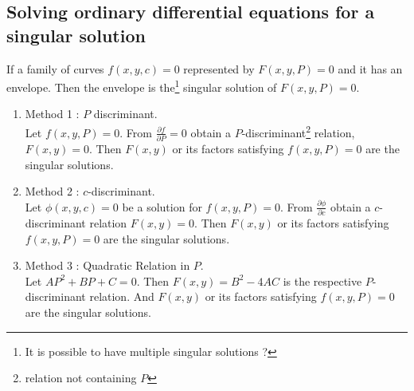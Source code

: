 \subsection{Solving ordinary differential equations for a singular solution}
\begin{definition}
	If a family of curves $f(x,y,c) = 0$ represented by $F(x,y,P) = 0$ and it has an envelope. Then the envelope is the\footnote{It is possible to have multiple singular solutions ?} singular solution of $F(x,y,P) = 0$.
\end{definition}
\begin{enumerate}
	\item Method 1 : $P$ discriminant.\\
		Let $f(x,y,P) = 0$.
		From $\frac{\partial f}{\partial P} = 0$ obtain a $P$-discriminant\footnote{relation not containing $P$} relation, $F(x,y) = 0$. Then $F(x,y)$ or its factors satisfying $f(x,y,P) = 0$ are the singular solutions.
	\item Method 2 : $c$-discriminant.\\
		Let $\phi(x,y,c) = 0$ be a solution for $f(x,y,P) = 0$.
		From $\frac{\partial \phi}{\partial c}$ obtain a $c$-discriminant relation $F(x,y) = 0$.
		Then $F(x,y)$ or its factors satisfying $f(x,y,P) = 0$ are the singular solutions.
	\item Method 3 : Quadratic Relation in $P$.\\
		Let $AP^2 + BP + C = 0$.
		Then $F(x,y) = B^2-4AC$ is the respective $P$-discriminant relation.
		And $F(x,y)$ or its factors satisfying $f(x,y,P) = 0$ are the singular solutions.
\end{enumerate}

